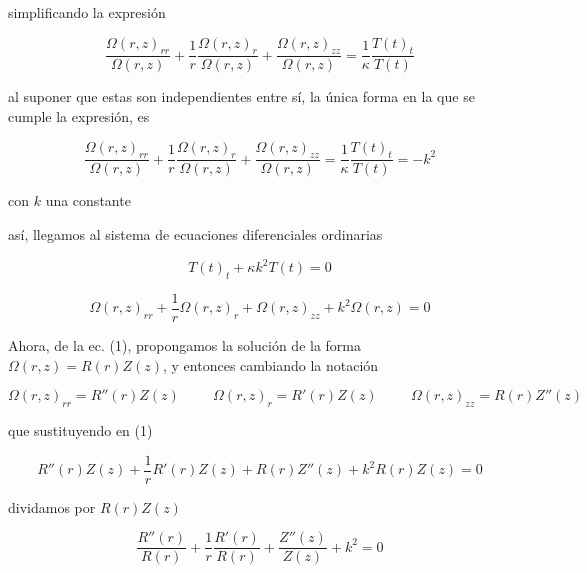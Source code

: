 \documentclass[12pt,a4paper]{article}
\begin{document}
\begin{enumerate}
    simplificando la expresión
    
    \begin{equation*}
        \frac{\Omega(r,z)_{rr}}{\Omega(r,z)} + \frac{1}{r} \frac{\Omega(r,z)_r}{\Omega(r,z)} + \frac{\Omega(r,z)_{zz}}{\Omega(r,z)}= \frac{1}{\kappa} \frac{T(t)_t}{T(t)}
    \end{equation*}
    
    al suponer que estas son independientes entre sí, la única forma en la que se cumple la expresión, es 
    
    \begin{equation*}
        \frac{\Omega(r,z)_{rr}}{\Omega(r,z)} + \frac{1}{r} \frac{\Omega(r,z)_r}{\Omega(r,z)} + \frac{\Omega(r,z)_{zz}}{\Omega(r,z)}= \frac{1}{\kappa} \frac{T(t)_t}{T(t)}= - k^2
    \end{equation*}
    
    con $k$ una constante
    

   así, llegamos al sistema de ecuaciones diferenciales ordinarias
   
   \begin{equation*}
       T(t)_t+\kappa k^2T(t)=0
   \end{equation*}
   
   \begin{equation}
       \Omega(r,z)_{rr}+\frac{1}{r}\Omega(r,z)_{r}+\Omega(r,z)_{zz}+k^2 \Omega(r,z)= 0 
   \end{equation}
   
    Ahora, de la ec. (1), propongamos la solución de la forma $\Omega(r,z)=R(r)Z(z)$, y entonces cambiando la notación
    
    \begin{equation*}
        \Omega(r,z)_{rr}= R''(r)Z(z) \hspace{1cm} \Omega(r,z)_r= R'(r)Z(z) \hspace{1cm} \Omega(r,z)_{zz}= R(r)Z''(z)
    \end{equation*}
    
    que sustituyendo en (1)
    
    \begin{equation*}
        R''(r)Z(z)+\frac{1}{r}R'(r)Z(z)+R(r)Z''(z)+ k^2 R(r)Z(z)=0
    \end{equation*}
    
    dividamos por $R(r)Z(z)$
    
    \begin{equation*}
        \frac{R''(r)}{R(r)} + \frac{1}{r} \frac{R'(r)}{R(r)}+\frac{Z''(z)}{Z(z)}+ k^2 =0
    \end{equation*}
    

\end{enumerate}
\end{document}
